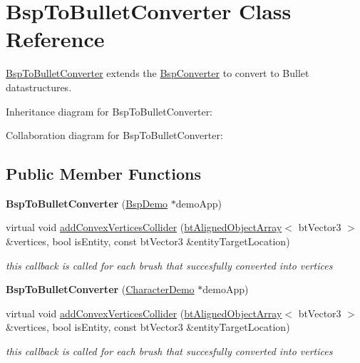 \hypertarget{class_bsp_to_bullet_converter}{\section{Bsp\+To\+Bullet\+Converter Class Reference}
\label{class_bsp_to_bullet_converter}
}


\hyperlink{class_bsp_to_bullet_converter}{Bsp\+To\+Bullet\+Converter} extends the \hyperlink{class_bsp_converter}{Bsp\+Converter} to convert to Bullet datastructures.  




Inheritance diagram for Bsp\+To\+Bullet\+Converter\+:


Collaboration diagram for Bsp\+To\+Bullet\+Converter\+:
\subsection*{Public Member Functions}
\begin{DoxyCompactItemize}
\item 
\hypertarget{class_bsp_to_bullet_converter_a5dd79c66aae23472732ed04d5b56bd05}{{\bfseries Bsp\+To\+Bullet\+Converter} (\hyperlink{class_bsp_demo}{Bsp\+Demo} $\ast$demo\+App)}\label{class_bsp_to_bullet_converter_a5dd79c66aae23472732ed04d5b56bd05}

\item 
virtual void \hyperlink{class_bsp_to_bullet_converter_a65518d022ee942099e82eadf4684b86b}{add\+Convex\+Vertices\+Collider} (\hyperlink{classbt_aligned_object_array}{bt\+Aligned\+Object\+Array}$<$ bt\+Vector3 $>$ \&vertices, bool is\+Entity, const bt\+Vector3 \&entity\+Target\+Location)
\begin{DoxyCompactList}\small\item\em this callback is called for each brush that succesfully converted into vertices \end{DoxyCompactList}\item 
\hypertarget{class_bsp_to_bullet_converter_ac49a1405460a30cfbe0019e968cbbdfd}{{\bfseries Bsp\+To\+Bullet\+Converter} (\hyperlink{class_character_demo}{Character\+Demo} $\ast$demo\+App)}\label{class_bsp_to_bullet_converter_ac49a1405460a30cfbe0019e968cbbdfd}

\item 
virtual void \hyperlink{class_bsp_to_bullet_converter_a65518d022ee942099e82eadf4684b86b}{add\+Convex\+Vertices\+Collider} (\hyperlink{classbt_aligned_object_array}{bt\+Aligned\+Object\+Array}$<$ bt\+Vector3 $>$ \&vertices, bool is\+Entity, const bt\+Vector3 \&entity\+Target\+Location)
\begin{DoxyCompactList}\small\item\em this callback is called for each brush that succesfully converted into vertices \end{DoxyCompactList}\end{DoxyCompactItemize}


